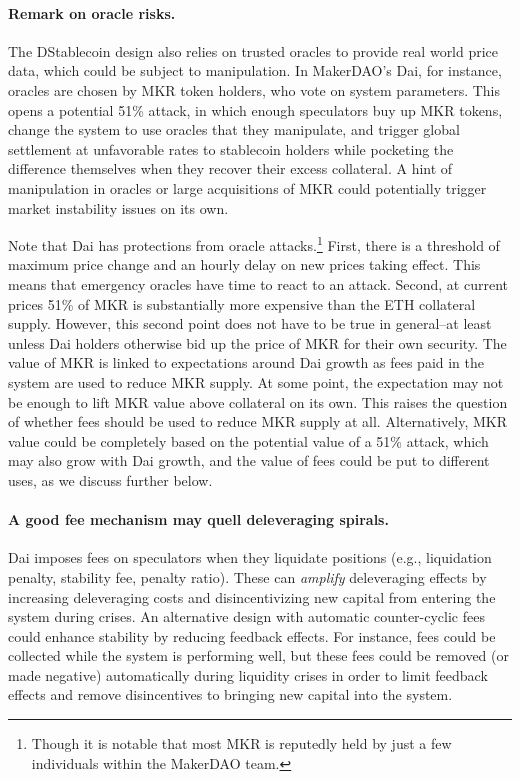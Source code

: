 \paragraph{Remark on oracle risks.}
The DStablecoin design also relies on trusted oracles to provide real world price data, which could be subject to manipulation. In MakerDAO's Dai, for instance, oracles are chosen by MKR token holders, who vote on system parameters. This opens a potential 51\% attack, in which enough speculators buy up MKR tokens, change the system to use oracles that they manipulate, and trigger global settlement at unfavorable rates to stablecoin holders while pocketing the difference themselves when they recover their excess collateral. A hint of manipulation in oracles or large acquisitions of MKR could potentially trigger market instability issues on its own.

Note that Dai has protections from oracle attacks.\footnote{Though it is notable that most MKR is reputedly held by just a few individuals within the MakerDAO team.} First, there is a threshold of maximum price change and an hourly delay on new prices taking effect. This means that emergency oracles have time to react to an attack. Second, at current prices 51\% of MKR is substantially more expensive than the ETH collateral supply. However, this second point does not have to be true in general--at least unless Dai holders otherwise bid up the price of MKR for their own security. The value of MKR is linked to expectations around Dai growth as fees paid in the system are used to reduce MKR supply. At some point, the expectation may not be enough to lift MKR value above collateral on its own. This raises the question of whether fees should be used to reduce MKR supply at all. Alternatively, MKR value could be completely based on the potential value of a 51\% attack, which may also grow with Dai growth, and the value of fees could be put to different uses, as we discuss further below.




\paragraph{A good fee mechanism may quell deleveraging spirals.}
Dai imposes fees on speculators when they liquidate positions (e.g., liquidation penalty, stability fee, penalty ratio). These can \emph{amplify} deleveraging effects by increasing deleveraging costs and disincentivizing new capital from entering the system during crises. An alternative design with automatic counter-cyclic fees could enhance stability by reducing feedback effects. For instance, fees could be collected while the system is performing well, but these fees could be removed (or made negative) automatically during liquidity crises in order to limit feedback effects and remove disincentives to bringing new capital into the system.

